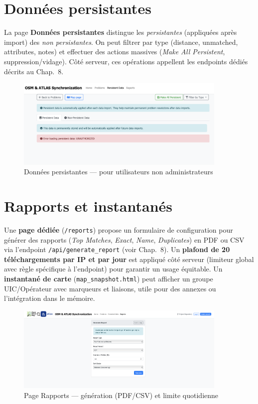 \section{Données persistantes}

La page \textbf{Données persistantes} distingue les \textit{persistantes} (appliquées après import) des \textit{non persistantes}. On peut filtrer par type (distance, unmatched, attributes, notes) et effectuer des actions massives (\textit{Make All Persistent}, suppression/vidage). Côté serveur, ces opérations appellent les endpoints dédiés décrits au Chap.~8.

\begin{figure}[h]
  \centering
  \includegraphics[width=0.9\textwidth]{../figures/chap9/non admin persisten data page.png}
  \caption[Données persistantes (non admin)]{Données persistantes — pour utilisateurs non administrateurs}
  \label{fig:frontend-persistent}
\end{figure}

\section{Rapports et instantanés}
\label{subsec:rapports}

Une \textbf{page dédiée} (\texttt{/reports}) propose un formulaire de configuration pour générer des rapports (\textit{Top Matches}, \textit{Exact}, \textit{Name}, \textit{Duplicates}) en PDF ou CSV via l'endpoint \texttt{/api/generate\_report} (voir Chap.~8). Un \textbf{plafond de 20 téléchargements par IP et par jour} est appliqué côté serveur (limiteur global avec règle spécifique à l'endpoint) pour garantir un usage équitable. Un \textbf{instantané de carte} (\texttt{map\_snapshot.html}) peut afficher un groupe UIC/Opérateur avec marqueurs et liaisons, utile pour des annexes ou l'intégration dans le mémoire.

\begin{figure}[h]
  \centering
  \includegraphics[width=0.9\textwidth]{../figures/chap9/download reports page.png}
  \caption[Page Rapports]{Page Rapports — génération (PDF/CSV) et limite quotidienne}
  \label{fig:frontend-report}
\end{figure}

